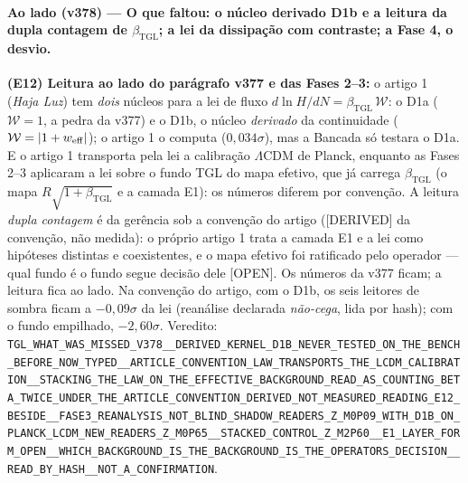 \documentclass[11pt]{article}
\newcommand{\bTGL}{\beta_{\mathrm{TGL}}}\newcommand{\Msun}{M_{\odot}}\newcommand{\TGL}{\mathrm{TGL}}
\theoremstyle{definition}\newtheorem{deriv}{Derivação}
\begin{document}
\paragraph*{Ao lado (v378) --- O que faltou: o núcleo derivado D1b e a leitura da dupla contagem de $\bTGL$; a lei da dissipação com contraste; a Fase 4, o desvio.} \textbf{(E12) Leitura ao lado do parágrafo v377 e das Fases 2--3:} o artigo 1 (\emph{Haja Luz}) tem \emph{dois} núcleos para a lei de fluxo $d\ln H/dN=\bTGL\,\mathcal W$: o D1a ($\mathcal W=1$, a pedra da v377) e o D1b, o núcleo \emph{derivado} da continuidade ($\mathcal W=|1+w_{\rm eff}|$); o artigo 1 o computa ($0{,}034\sigma$), mas a Bancada só testara o D1a. E o artigo 1 transporta pela lei a calibração $\Lambda$CDM de Planck, enquanto as Fases 2--3 aplicaram a lei sobre o fundo TGL do mapa efetivo, que já carrega $\bTGL$ (o mapa $R\sqrt{1+\bTGL}$ e a camada E1): os números diferem por convenção. A leitura \emph{dupla contagem} é da gerência sob a convenção do artigo (\textsf{[DERIVED]} da convenção, não medida): o próprio artigo 1 trata a camada E1 e a lei como hipóteses distintas e coexistentes, e o mapa efetivo foi ratificado pelo operador --- qual fundo é o fundo segue decisão dele \textsf{[OPEN]}. Os números da v377 ficam; a leitura fica ao lado. Na convenção do artigo, com o D1b, os seis leitores de sombra ficam a $-0{,}09\sigma$ da lei (reanálise declarada \emph{não-cega}, lida por hash); com o fundo empilhado, $-2{,}60\sigma$. Veredito: \texttt{TGL\_WHAT\_WAS\_MISSED\_V378\_\_DERIVED\_KERNEL\_D1B\_NEVER\_TESTED\_ON\_THE\_BENCH\_BEFORE\_NOW\_TYPED\_\_ARTICLE\_CONVENTION\_LAW\_TRANSPORTS\_THE\_LCDM\_CALIBRATION\_\_STACKING\_THE\_LAW\_ON\_THE\_EFFECTIVE\_BACKGROUND\_READ\_AS\_COUNTING\_BETA\_TWICE\_UNDER\_THE\_ARTICLE\_CONVENTION\_DERIVED\_NOT\_MEASURED\_READING\_E12\_BESIDE\_\_FASE3\_REANALYSIS\_NOT\_BLIND\_SHADOW\_READERS\_Z\_M0P09\_WITH\_D1B\_ON\_PLANCK\_LCDM\_NEW\_READERS\_Z\_M0P65\_\_STACKED\_CONTROL\_Z\_M2P60\_\_E1\_LAYER\_FORM\_OPEN\_\_WHICH\_BACKGROUND\_IS\_THE\_BACKGROUND\_IS\_THE\_OPERATORS\_DECISION\_\_READ\_BY\_HASH\_\_NOT\_A\_CONFIRMATION}.
\end{document}
